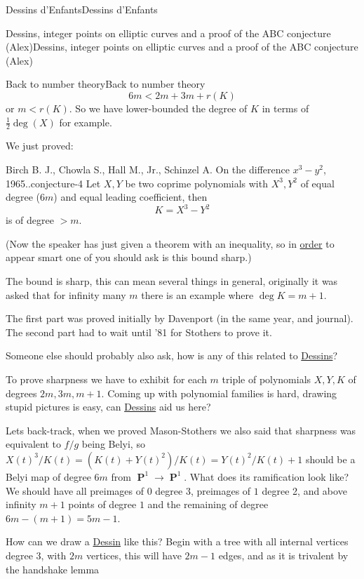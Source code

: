 \documentclass[10pt,]{book}
\numberwithin{equation}{section}
\DeclareMathOperator{\PP}{\mathbf{P}}
\newcommand{\lt}{<}
\newcommand{\gt}{>}
\begin{document}
\begin{chapterptx}{Dessins d'Enfants}{}{Dessins d'Enfants}{}{}
\begin{sectionptx}{Dessins, integer points on elliptic curves and a proof of the ABC conjecture (Alex)}{}{Dessins, integer points on elliptic curves and a proof of the ABC conjecture (Alex)}{}{}
\begin{subsectionptx}{Back to number theory}{}{Back to number theory}{}{}
\begin{equation*}
6m \lt 2m + 3m + r(K)
\end{equation*}
or \(m \lt r(K)\). So we have lower-bounded the degree of \(K\) in terms of \(\frac 12 \deg(X)\) for example.%
\par
\hypertarget{p-720}{}%
We just proved:%
\begin{conjecture}{Birch B. J., Chowla S., Hall M., Jr., Schinzel A. On the difference \(x^3 - y^2\), 1965..}{}{conjecture-4}%
\hypertarget{p-721}{}%
Let \(X, Y\) be two coprime polynomials with \(X^3,Y^2\) of equal degree (\(6m\)) and equal leading coefficient, then%
\begin{equation*}
K = X^3 - Y^2
\end{equation*}
is of degree \(\gt m\).%
\par
\hypertarget{p-722}{}%
(Now the speaker has just given a theorem with an inequality, so in \hyperref[def-order-quaternion]{order} to appear smart one of you should ask is this bound sharp.)%
\par
\hypertarget{p-723}{}%
The bound is sharp, this can mean several things in general, originally it was asked that for infinity many \(m\) there is an example where \(\deg K = m + 1\).%
\end{conjecture}
\hypertarget{p-724}{}%
The first part was proved initially by Davenport (in the same year, and journal). The second part had to wait until '81 for Stothers to prove it.%
\par
\hypertarget{p-725}{}%
Someone else should probably also ask, how is any of this related to \hyperref[def-dessin-denfant]{Dessins}?%
\par
\hypertarget{p-726}{}%
To prove sharpness we have to exhibit for each \(m\) triple of polynomials \(X,Y,K\) of degrees \(2m,3m,m+1\). Coming up with polynomial families is hard, drawing stupid pictures is easy, can \hyperref[def-dessin-denfant]{Dessins} aid us here?%
\par
\hypertarget{p-727}{}%
Lets back-track, when we proved Mason-Stothers we also said that sharpness was equivalent to \(f/g\) being Belyi, so \(X(t)^3/K(t) = (K(t) + Y(t)^2) / K(t) = Y(t)^2/K(t) + 1\) should be a Belyi map of degree \(6m\) from \(\PP^1\to \PP^1\). What does its ramification look like? We should have all preimages of \(0\) degree 3, preimages of \(1\) degree 2, and above infinity \(m + 1\) points of degree \(1\) and the remaining of degree \(6m - (m + 1) = 5m - 1\).%
\par
\hypertarget{p-728}{}%
How can we draw a \hyperref[def-dessin-denfant]{Dessin} like this? Begin with a tree with all internal vertices degree 3, with \(2m\) vertices, this will have \(2m - 1\) edges, and as it is trivalent by the handshake lemma%

\end{subsectionptx}
\end{sectionptx}
\end{chapterptx}
\end{document}
